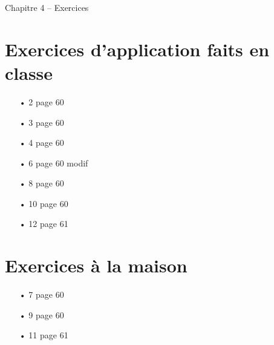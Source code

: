 \documentclass[12pt,a4paper]{article}
\begin{document}
\begin{header}
Chapitre 4 -- Exercices
\end{header}

\section*{Exercices d'application faits en classe}

\begin{multicols}{4}
\begin{itemize}
\item[•] 2 page 60
\item[•] 3 page 60
\item[•] 4 page 60
\item[•] 6 page 60 modif
\item[•] 8 page 60
\item[•] 10 page 60
\item[•] 12 page 61
\end{itemize}
\end{multicols}

\section*{Exercices à la maison}

\begin{multicols}{4}
\begin{itemize}
\item[•] 7 page 60
\item[•] 9 page 60
\item[•] 11 page 61
\end{itemize}
\end{multicols}
\end{document}
